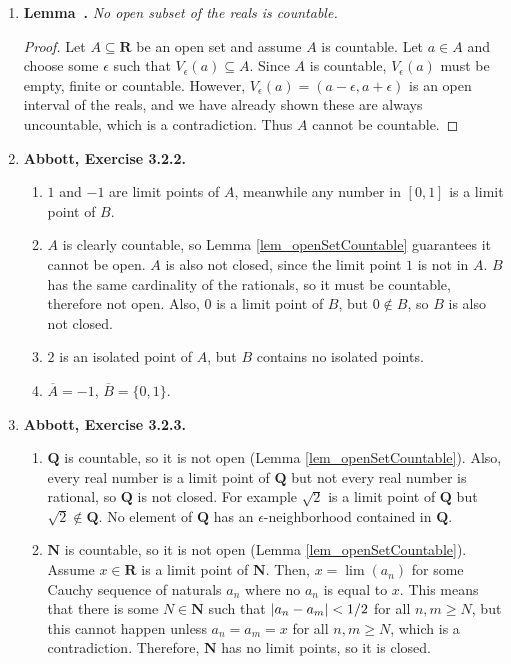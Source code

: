 \documentclass{article}
\newcounter{lemmaCounter}
\newenvironment{shortlemma}{\refstepcounter{lemmaCounter}
\noindent\textbf{Lemma~\thelemmaCounter.}\em}
\DeclarePairedDelimiter\abs{\lvert}{\rvert}
\newcommand{\N}{\mathbf{N}}
\newcommand{\Q}{\mathbf{Q}}
\newcommand{\R}{\mathbf{R}}
\newcommand{\set}[1]{\{#1\}}
\newcommand{\exc}[2][Abbott]{\item \textbf{#1, Exercise #2.}}
\begin{document}
\begin{enumerate}
    \item \begin{shortlemma} \label{lem_openSetCountable}
        No open subset of the reals is countable.
    \end{shortlemma}
    
    \begin{proof}
        Let $A \subseteq \R$ be an open set and assume $A$ is countable. Let $a \in A$ and choose some $\epsilon$ such that $V_\epsilon(a) \subseteq A$. Since $A$ is countable, $V_\epsilon(a)$ must be empty, finite or countable. However, $V_\epsilon(a) = (a-\epsilon, a+\epsilon)$ is an open interval of the reals, and we have already shown these are always uncountable, which is a contradiction. Thus $A$ cannot be countable.
    \end{proof}
    
    \exc{3.2.2}
    \begin{enumerate}
        \item $1$ and $-1$ are limit points of $A$, meanwhile any number in $[0, 1]$ is a limit point of $B$.
        
        \item $A$ is clearly countable, so Lemma \ref{lem_openSetCountable} guarantees it cannot be open. $A$ is also not closed, since the limit point $1$ is not in $A$. $B$ has the same cardinality of the rationals, so it must be countable, therefore not open. Also, $0$ is a limit point of $B$, but $0 \notin B$, so $B$ is also not closed.
        
        \item $2$ is an isolated point of $A$, but $B$ contains no isolated points.
        
        \item $\overline{A} = -1$, $\overline{B} = \set{0, 1}$.
    \end{enumerate}
    
    \exc{3.2.3}
    \begin{enumerate}
        \item $\Q$ is countable, so it is not open (Lemma \ref{lem_openSetCountable}). Also, every real number is a limit point of $\Q$ but not every real number is rational, so $\Q$ is not closed. For example $\sqrt{2}$ is a limit point of $\Q$ but $\sqrt{2} \notin \Q$. No element of $\Q$ has an $\epsilon$-neighborhood contained in $\Q$.
        
        \item $\N$ is countable, so it is not open (Lemma \ref{lem_openSetCountable}). Assume $x \in \R$ is a limit point of $\N$. Then, $x = \lim(a_n)$ for some Cauchy sequence of naturals $a_n$ where no $a_n$ is equal to $x$. This means that there is some $N \in \N$ such that $\abs*{a_n-a_m} < 1/2$ for all $n,m \geq N$, but this cannot happen unless $a_n = a_m = x$ for all $n,m \geq N$, which is a contradiction. Therefore, $\N$ has no limit points, so it is closed.
        

\end{enumerate}
\end{enumerate}
\end{document}
